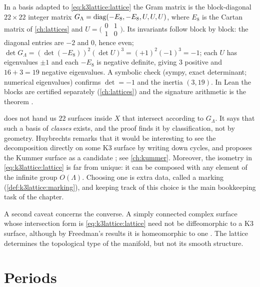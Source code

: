 \begin{example}\label{ex:k3lattice:gram}
In a basis adapted to \eqref{eq:k3lattice:lattice} the Gram matrix is the block-diagonal
$22\times22$ integer matrix $G_\Lambda=\operatorname{diag}(-E_8,-E_8,U,U,U)$, where $E_8$ is the Cartan
matrix of \cref{ch:lattices} and
$U=\bigl(\begin{smallmatrix}0&1\\1&0\end{smallmatrix}\bigr)$. Its invariants follow block by
block: the diagonal entries are $-2$ and $0$, hence even; $\det G_\Lambda=(\det(-E_8))^2(\det
U)^3=(+1)^2(-1)^3=-1$; each $U$ has eigenvalues $\pm1$ and each $-E_8$ is negative definite,
giving $3$ positive and $16+3=19$ negative eigenvalues. A symbolic check (sympy, exact
determinant; numerical eigenvalues) confirms $\det=-1$ and the inertia $(3,19)$. In Lean the
blocks are certified separately (\cref{ch:lattices}) and the signature arithmetic is the
theorem .
\end{example}

\begin{pitfallbox}
 does not hand us $22$ surfaces inside $X$ that intersect
according to $G_\Lambda$. It says that such a basis of \emph{classes} exists, and the proof
finds it by classification, not by geometry. Huybrechts remarks that it would be interesting
to see the decomposition directly on some K3 surface by writing down cycles, and proposes
the Kummer surface as a candidate ; see \cref{ch:kummer}. Moreover,
the isometry in \eqref{eq:k3lattice:lattice} is far from unique: it can be composed with any
element of the infinite group $O(\Lambda)$. Choosing one is extra data, called a marking
(\cref{def:k3lattice:marking}), and keeping track of this choice is the main bookkeeping
task of the chapter.
\end{pitfallbox}

A second caveat concerns the converse. A simply connected complex surface whose
intersection form is \eqref{eq:k3lattice:lattice} need not be diffeomorphic to a K3 surface,
although by Freedman's results it is homeomorphic to one
. The lattice determines the topological type
of the manifold, but not its smooth structure.

\section{Periods}\label{sec:k3lattice:periods}

